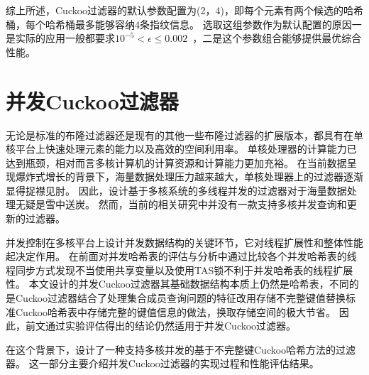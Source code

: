 综上所述，Cuckoo过滤器的默认参数配置为(2，4)，即每个元素有两个候选的哈希桶，每个哈希桶最多能够容纳4条指纹信息。
选取这组参数作为默认配置的原因一是实际的应用一般都要求$ 10^{-5} < \epsilon \leq 0.002$~\cite{broder2004network}，二是这个参数组合能够提供最优综合性能。

\section{并发Cuckoo过滤器}
无论是标准的布隆过滤器还是现有的其他一些布隆过滤器的扩展版本，都具有在单核平台上快速处理元素的能力以及高效的空间利用率。
单核处理器的计算能力已达到瓶颈，相对而言多核计算机的计算资源和计算能力更加充裕。
在当前数据呈现爆炸式增长的背景下，海量数据处理压力越来越大，单核处理器上的过滤器逐渐显得捉襟见肘。
因此，设计基于多核系统的多线程并发的过滤器对于海量数据处理无疑是雪中送炭。
然而，当前的相关研究中并没有一款支持多核并发查询和更新的过滤器。

并发控制在多核平台上设计并发数据结构的关键环节，它对线程扩展性和整体性能起决定作用。
在前面对并发哈希表的评估与分析中通过比较各个并发哈希表的线程同步方式发现不当使用共享变量以及使用TAS锁不利于并发哈希表的线程扩展性。
本文设计的并发Cuckoo过滤器其基础数据结构本质上仍然是哈希表，不同的是Cuckoo过滤器结合了处理集合成员查询问题的特征改用存储不完整键值替换标准Cuckoo哈希表中存储完整的键值信息的做法，换取存储空间的极大节省。
因此，前文通过实验评估得出的结论仍然适用于并发Cuckoo过滤器。

在这个背景下，设计了一种支持多核并发的基于不完整键Cuckoo哈希方法的过滤器。
这一部分主要介绍并发Cuckoo过滤器的实现过程和性能评估结果。

